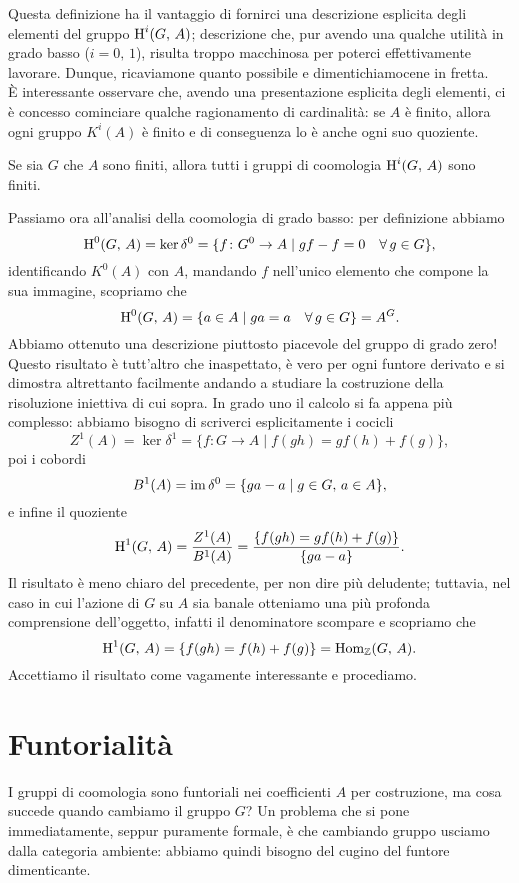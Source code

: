 Questa definizione ha il vantaggio di fornirci una descrizione esplicita degli elementi del gruppo $ \operatorname{H}^i(G, \, A) $; descrizione che, pur avendo una qualche utilità in grado basso ($ i = 0,\, 1 $), risulta troppo macchinosa per poterci effettivamente lavorare. Dunque, ricaviamone quanto possibile e dimentichiamocene in fretta. \\

È interessante osservare che, avendo una presentazione esplicita degli elementi, ci è concesso cominciare qualche ragionamento di cardinalità: se $ A $ è finito, allora ogni gruppo $ K^i(A) $ è finito e di conseguenza lo è anche ogni suo quoziente.
\begin{lemma}
	Se sia $ G $ che $ A $ sono finiti, allora tutti i gruppi di coomologia $ \operatorname{H}^i(G, \, A) $ sono finiti.
\end{lemma}

Passiamo ora all'analisi della coomologia di grado basso: per definizione abbiamo
$$  \operatorname{H}^0(G, \, A) = \ker \delta^0 = \{ f \colon G^0 \to A \mid gf-f = 0 \quad \forall \, g \in G \},  $$
identificando $ K^0(A) $ con $ A $, mandando $ f $ nell'unico elemento che compone la sua immagine, scopriamo che
\[ \operatorname{H}^0(G, \, A) = \{ a \in A \mid ga = a \quad \forall \, g \in G \} = A^G. \]
Abbiamo ottenuto una descrizione piuttosto piacevole del gruppo di grado zero! Questo risultato è tutt'altro che inaspettato, è vero per ogni funtore derivato e si dimostra altrettanto facilmente andando a studiare la costruzione della risoluzione iniettiva di cui sopra. In grado uno il calcolo si fa appena più complesso: abbiamo bisogno di scriverci esplicitamente i cocicli
\[ Z^1(A) = \ker \delta^1 = \{ f \colon G \to A \mid f(gh) = gf(h) + f(g) \}, \]
poi i cobordi
\[ B^1(A) = \operatorname{im} \delta^0 = \{ ga - a \mid g \in G, \, a \in A  \}, \]
e infine il quoziente
\[ \operatorname{H}^1(G, \, A) = \frac{Z^1(A)}{B^1(A)} = \frac{\{ f(gh) = gf(h) + f(g) \}}{\{ ga - a\}}. \]
Il risultato è meno chiaro del precedente, per non dire più deludente; tuttavia, nel caso in cui l'azione di $ G $ su $ A $ sia banale otteniamo una più profonda comprensione dell'oggetto, infatti il denominatore scompare e scopriamo che
\[ \operatorname{H}^1(G, \, A) = \{ f(gh) = f(h) + f(g) \} = \operatorname{Hom}_{\mathbb{Z}}(G, \, A). \]
Accettiamo il risultato come vagamente interessante e procediamo.

\section{Funtorialità}
I gruppi di coomologia sono funtoriali nei coefficienti $ A $ per costruzione, ma cosa succede quando cambiamo il gruppo $ G $? Un problema che si pone immediatamente, seppur puramente formale, è che cambiando gruppo usciamo dalla categoria ambiente: abbiamo quindi bisogno del cugino del funtore dimenticante.

